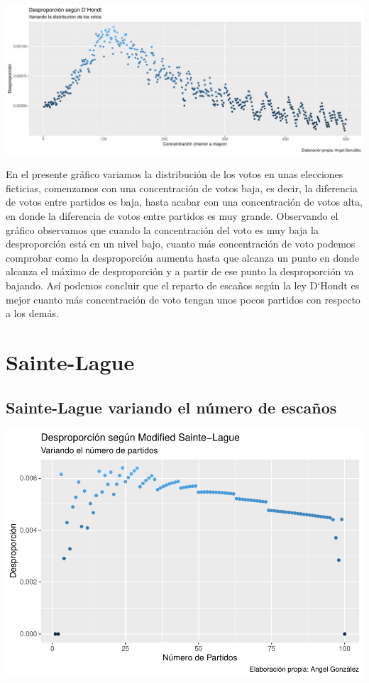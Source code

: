 \documentclass[12pt,a4paper,]{book}
\numberwithin{dummy}{section}
\theoremstyle{ocrenumbox}
\theoremstyle{blacknumex}
\theoremstyle{blacknumbox}
\theoremstyle{ocrenum}
\theoremstyle{ocrenum}
\begin{document}
\begin{center}\includegraphics[width=0.95\linewidth]{figurasR/unnamed-chunk-14-1} \end{center}

En el presente gráfico variamos la distribución de los votos en unas
elecciones ficticias, comenzamos con una concentración de votos baja, es
decir, la diferencia de votos entre partidos es baja, hasta acabar con
una concentración de votos alta, en donde la diferencia de votos entre
partidos es muy grande. Observando el gráfico observamos que cuando la
concentración del voto es muy baja la desproporción está en un nivel
bajo, cuanto más concentración de voto podemos comprobar como la
desproporción aumenta hasta que alcanza un punto en donde alcanza el
máximo de desproporción y a partir de ese punto la desproporción va
bajando. Así podemos concluir que el reparto de escaños según la ley
D`Hondt es mejor cuanto más concentración de voto tengan unos pocos
partidos con respecto a los demás.

\hypertarget{sainte-lague}{%
\section{Sainte-Lague}\label{sainte-lague}}

\hypertarget{sainte-lague-variando-el-nuxfamero-de-escauxf1os}{%
\subsection{Sainte-Lague variando el número de
escaños}\label{sainte-lague-variando-el-nuxfamero-de-escauxf1os}}

\begin{center}\includegraphics[width=0.95\linewidth]{figurasR/unnamed-chunk-17-1} \end{center}
\end{document}

